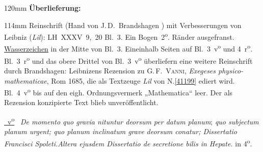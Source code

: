 


\begin{ledgroupsized}[r]{120mm}
\footnotesize
\pstart
\noindent\textbf{Überlieferung:}
\pend
\end{ledgroupsized}
\begin{ledgroupsized}[r]{114mm}
\footnotesize
\pstart
\parindent -6mm
%
Reinschrift
(Hand von J.\,D.~Brandshagen%
) %
mit Verbesserungen von Leibniz (\textit{Lil}):
LH~XXXV~9,~20 Bl.~3.
Ein Bogen~2\textsuperscript{o}.
Ränder ausgefranst.
\href{\Scan{LH_35_09_20_003wz}}%
{Wasserzeichen} in der Mitte von Bl.~3.
Eineinhalb Seiten auf Bl.~3~v\textsuperscript{o} und 4~r\textsuperscript{o}.
Bl.~3~r\textsuperscript{o} und das obere Drittel von Bl.~3~v\textsuperscript{o}
überliefern eine weitere Reinschrift durch Brandshagen:
Leibnizens Rezension zu \textsc{G.\,F.~Vanni},
\cite{02000}\textit{Exegeses physico-mathematicae}, Rom 1685, die als Textzeuge \textit{Lil} von N.\;\ref{41199} ediert wird.
Bl.~4~v\textsuperscript{o} bis auf den eigh. Ordnungsvermerk „Mathematica“ leer.
Der als Rezension konzipierte Text blieb unveröffentlicht.
\pend
\end{ledgroupsized}
\vspace{8mm}
\pstart
\centering
\href{\Scan{LH_35_09_20_003v}}%
{~v\textsuperscript{o}\rbrack}\ 
\hfill
\cite{02095}\textit{De momento quo gravia nituntur deorsum per datum planum};
\hfill
{}
\linebreak 
\textit{quo subjectum planum urgent; quo planum inclinatum grave}\linebreak 
\textit{deorsum conatur; Dissertatio Francisci Spoleti.}\linebreak \textit{Altera ejusdem Dissertatio de secretione bilis in Hepate.} 
in 4\textsuperscript{o}. 
\pend
\vspace{0.5\baselineskip}
\pstart\noindent
{}
